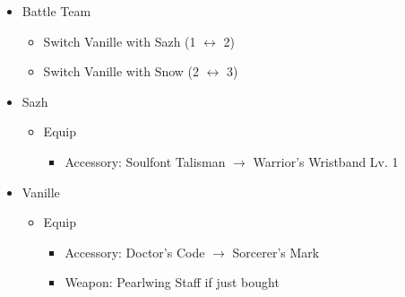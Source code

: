 \documentclass{report}
\begin{document}
\begin{menu}
\begin{itemize}
    \paradigm
    \begin{itemize}
        \item Battle Team
        \begin{itemize}
            \item Switch Vanille with Sazh (1 $\leftrightarrow$ 2)
            \item Switch Vanille with Snow (2 $\leftrightarrow$ 3)
        \end{itemize}
    \end{itemize}
    \equip
    \begin{itemize}
        \item Sazh
        \begin{itemize}
            \item Equip
            \begin{itemize}
                \item Accessory: Soulfont Talisman $\rightarrow$ Warrior's Wristband Lv. 1
            \end{itemize}
        \end{itemize}
        \item Vanille
        \begin{itemize}
            \item Equip
            \begin{itemize}
                \item Accessory: Doctor's Code $\rightarrow$ Sorcerer's Mark
                \item Weapon: Pearlwing Staff if just bought
            \end{itemize}
        \end{itemize}
    \end{itemize}
\end{itemize}
\end{menu}
\end{document}

